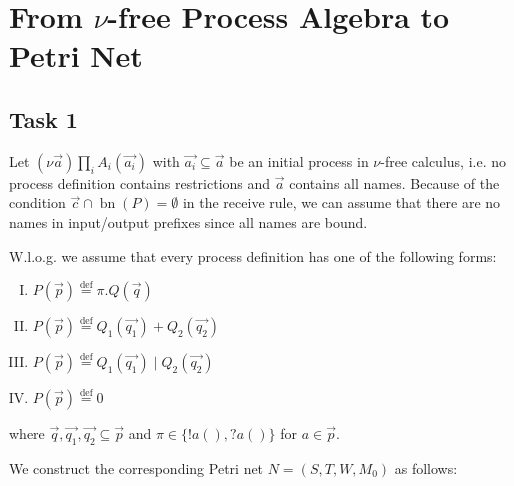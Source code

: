 \section{From $\nu$-free Process Algebra to Petri Net}
\subsection{Task 1}
Let $(\nu \vec{a}) \prod_i A_i(\vec{a_i})$ with $\vec{a_i} \subseteq \vec{a}$ be an initial process in $\nu$-free calculus, i.e. no process definition contains restrictions and $\vec{a}$ contains all names.
Because of the condition $\vec{c} \cap \operatorname{bn}(P) = \emptyset$ in the receive rule, we can assume that there are no names in input/output prefixes since all names are bound.

W.l.o.g. we assume that every process definition has one of the following forms:
\begin{enumerate}[(I)]
\item $P(\vec{p}) \stackrel{\text{def}}{=} \pi.Q(\vec{q})$
\item $P(\vec{p}) \stackrel{\text{def}}{=} Q_1(\vec{q_1}) + Q_2(\vec{q_2})$
\item $P(\vec{p}) \stackrel{\text{def}}{=} Q_1(\vec{q_1}) \mid Q_2(\vec{q_2})$
\item $P(\vec{p}) \stackrel{\text{def}}{=} 0$
\end{enumerate}
where $\vec{q},\vec{q_1},\vec{q_2} \subseteq \vec{p}$ and $\pi \in \{!a(), ?a()\}$ for $a \in \vec{p}$.

We construct the corresponding Petri net $N = (S, T, W, M_0)$ as follows:

